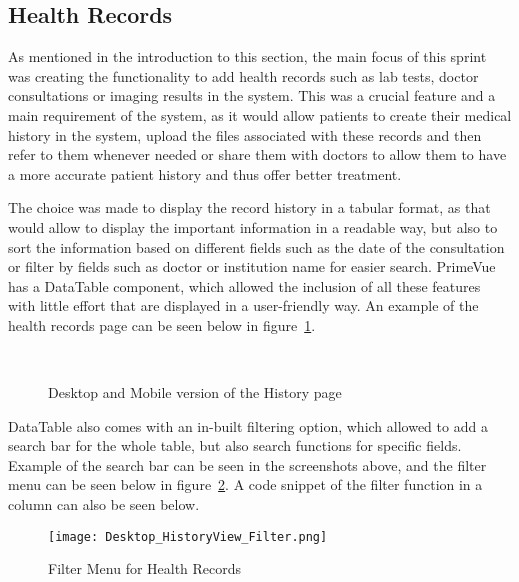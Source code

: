 \subsection{Health Records}

As mentioned in the introduction to this section, the main focus of this sprint was creating the functionality to add health records such as lab tests, doctor consultations or imaging results in the system. This was a crucial feature and a main requirement of the system, as it would allow patients to create their medical history in the system, upload the files associated with these records and then refer to them whenever needed or share them with doctors to allow them to have a more accurate patient history and thus offer better treatment.

The choice was made to display the record history in a tabular format, as that would allow to display the important information in a readable way, but also to sort the information based on different fields such as the date of the consultation or filter by fields such as doctor or institution name for easier search. PrimeVue has a DataTable component, which allowed the inclusion of all these features with little effort that are displayed in a user-friendly way. An example of the health records page can be seen below in figure~\ref{fig:healthrecordspage}.

\begin{figure}[ht]
  \centering
  \\[\baselineskip]
  \caption{Desktop and Mobile version of the History page}\label{fig:healthrecordspage}
\end{figure}

\FloatBarrier{}

DataTable also comes with an in-built filtering option, which allowed to add a search bar for the whole table, but also search functions for specific fields. Example of the search bar can be seen in the screenshots above, and the filter menu can be seen below in figure~\ref{fig:filtermenu}. A code snippet of the filter function in a column can also be seen below.

\begin{figure}[htbp]
  \centering
  \texttt{[image: Desktop\_HistoryView\_Filter.png]}
  \caption{Filter Menu for Health Records}\label{fig:filtermenu}
\end{figure}

